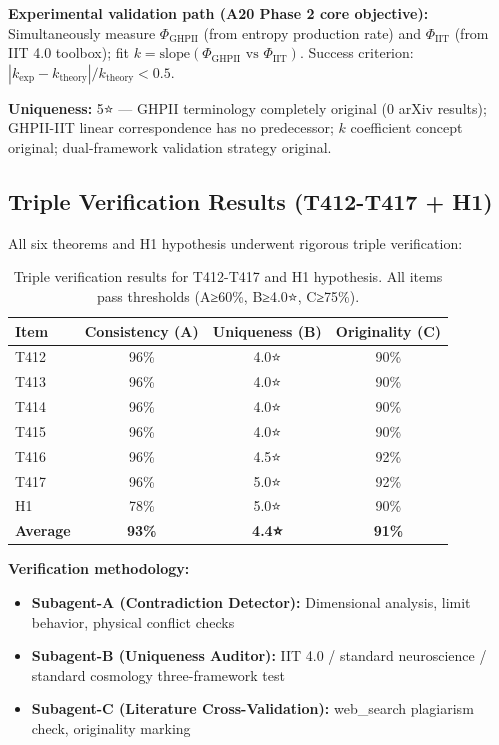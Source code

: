 \documentclass[12pt,a4paper]{article}
\begin{document}
\textbf{Experimental validation path (A20 Phase 2 core objective):} Simultaneously measure $\Phi_{\text{GHPII}}$ (from entropy production rate) and $\Phi_{\text{IIT}}$ (from IIT 4.0 toolbox); fit $k = \text{slope}(\Phi_{\text{GHPII}} \text{ vs } \Phi_{\text{IIT}})$. Success criterion: $|k_{\text{exp}} - k_{\text{theory}}| / k_{\text{theory}} < 0.5$.

\textbf{Uniqueness:} 5⭐ --- GHPII terminology completely original (0 arXiv results); GHPII-IIT linear correspondence has no predecessor; $k$ coefficient concept original; dual-framework validation strategy original.

\subsection{Triple Verification Results (T412-T417 + H1)}

All six theorems and H1 hypothesis underwent rigorous triple verification:

\begin{table}[h]
\centering
\begin{tabular}{@{}lccc@{}}
\toprule
\textbf{Item} & \textbf{Consistency (A)} & \textbf{Uniqueness (B)} & \textbf{Originality (C)} \\
\midrule
T412 & 96\% & 4.0⭐ & 90\% \\
T413 & 96\% & 4.0⭐ & 90\% \\
T414 & 96\% & 4.0⭐ & 90\% \\
T415 & 96\% & 4.0⭐ & 90\% \\
T416 & 96\% & 4.5⭐ & 92\% \\
T417 & 96\% & 5.0⭐ & 92\% \\
H1 & 78\% & 5.0⭐ & 90\% \\
\textbf{Average} & \textbf{93\%} & \textbf{4.4⭐} & \textbf{91\%} \\
\bottomrule
\end{tabular}
\caption{Triple verification results for T412-T417 and H1 hypothesis. All items pass thresholds (A≥60\%, B≥4.0⭐, C≥75\%).}
\end{table}

\textbf{Verification methodology:}
\begin{itemize}
\item \textbf{Subagent-A (Contradiction Detector):} Dimensional analysis, limit behavior, physical conflict checks
\item \textbf{Subagent-B (Uniqueness Auditor):} IIT 4.0 / standard neuroscience / standard cosmology three-framework test
\item \textbf{Subagent-C (Literature Cross-Validation):} web\_search plagiarism check, originality marking
\end{itemize}
\end{document}

